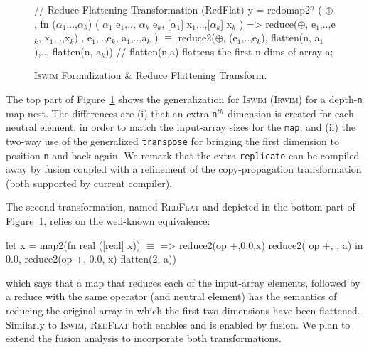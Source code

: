 \documentclass{sigplanconf}  %
\newcommand{\emp}[1]{\textcolor{DikuRed}{ #1}}
\newcommand{\emphh}[1]{\textcolor{CosGreen}{ #1}}
\newcommand{\mymath}[1]{$ #1 $}
\newcommand{\myindx}[1]{_{#1}}
\newcommand{\myindu}[1]{^{#1}}
\begin{document}
\begin{figure}[bt]
{\begin{colorcode}
// \emp{Reduce Flattening Transformation (RedFlat)}
y = redomap2\mymath{\myindu{n}} ( \mymath{\oplus} 
               , fn (\mymath{\alpha\myindx{1}},..,\mymath{\alpha\myindx{k}}) ( \mymath{\alpha\myindx{1}} e\mymath{\myindx{1}},..,  \mymath{\alpha\myindx{k}} e\mymath{\myindx{k}},
                                [\mymath{\alpha\myindx{1}}] x\mymath{\myindx{1}},..,[\mymath{\alpha\myindx{k}}] x\mymath{\myindx{k}} ) => 
                     reduce(\mymath{\oplus}, e\mymath{\myindx{1}},..,e\mymath{\myindx{k}}, x\mymath{\myindx{1}},..,x\mymath{\myindx{k}})
               , e\mymath{\myindx{1}},..,e\mymath{\myindx{k}}, a\mymath{\myindx{1}},..,a\mymath{\myindx{k}} )
        \emphh{\mymath{\equiv}}
reduce2(\mymath{\oplus}, (e\mymath{\myindx{1}},..,e\mymath{\myindx{k}}), flatten(n, a\mymath{\myindx{1}}),.., flatten(n, a\mymath{\myindx{k}}))
// flatten(n,a) flattens the first n dims of array a;
\end{colorcode}
} \vspace{-2ex}
\caption{\textsc{Iswim} Formalization \& Reduce Flattening Transform.}
\label{fig:TransfGen}
\end{figure}

The top part of Figure~\ref{fig:TransfGen} shows the generalization
for \textsc{Iswim} (\textsc{Irwim}) for a depth-{\tt n} map nest.   
The differences are (i) that an extra {\tt n$^{th}$} dimension is 
created for each neutral element, in order to match the input-array 
sizes for the {\tt map},  and (ii) the two-way use of the generalized 
{\tt transpose} for bringing the first dimension to position {\tt n}
and back again. We remark that the extra {\tt replicate} can be compiled
away by fusion coupled with a refinement of the copy-propagation 
transformation (both supported by current compiler).

The second transformation, named \textsc{RedFlat} and depicted in the 
bottom-part of Figure~\ref{fig:TransfGen}, relies on the well-known equivalence:
\begin{colorcode}
let x = map2(fn real ([real] x))      \emphh{\mymath{\equiv}}
              => reduce2(op +,0.0,x)     reduce2( op +, 
            , a) in                               0.0,
reduce2(op +, 0.0, x)                      flatten(2, a))
\end{colorcode}
\noindent which says that a map that reduces each of the input-array 
elements, followed by a reduce with the same operator (and neutral element)
has the semantics of reducing the original array in which the first two 
dimensions have been flattened. 
Similarly to \textsc{Iswim}, \textsc{RedFlat} both enables and is enabled 
by fusion. We plan to extend the fusion analysis to incorporate both 
transformations.
\end{document}
